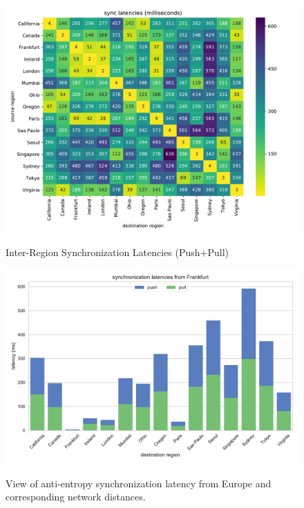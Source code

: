 \begin{figure}
    \begin{center}
        \includegraphics[width=5in]{figures/ch06_latency_sync_heatmap.pdf}
    \end{center}
    \renewcommand{\baselinestretch}{1}
    \small\normalsize

    \begin{quote}
        \caption[Anti-Entropy Synchronization Latencies]{Inter-Region Synchronization Latencies (Push+Pull)}
        \label{fig:ch06_latency_sync_heatmap}
    \end{quote}
\end{figure}
\renewcommand{\baselinestretch}{2}
\small\normalsize

\begin{figure}
    \begin{center}
        \includegraphics[width=5in]{figures/ch06_push_pull_frankfurt_latencies.pdf}
    \end{center}
    \renewcommand{\baselinestretch}{1}
    \small\normalsize

    \begin{quote}
        \caption[Anti-Entropy Synchronization Latency from Frankfurt]{View of anti-entropy synchronization latency from Europe and corresponding network distances.}
        \label{fig:ch06_push_pull_frankfurt_latencies}
    \end{quote}
\end{figure}
\renewcommand{\baselinestretch}{2}
\small\normalsize

